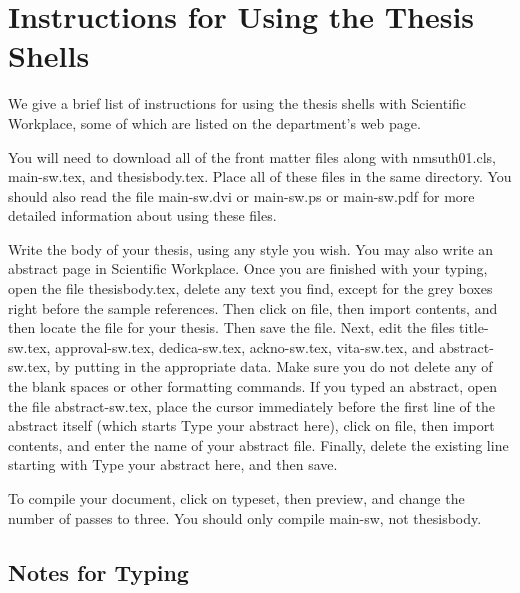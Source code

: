                       


\section{Instructions for Using the Thesis Shells}

We give a brief list of instructions for using the thesis shells with
Scientific Workplace, some of which are listed on the department's web page.

You will need to download all of the front matter files along with
nmsuth01.cls, main-sw.tex, and thesisbody.tex. Place all of these files in
the same directory. You should also read the file main-sw.dvi or main-sw.ps
or main-sw.pdf for more detailed information about using these files.

Write the body of your thesis, using any style you wish. You may also write
an abstract page in Scientific Workplace. Once you are finished with your
typing, open the file thesisbody.tex, delete any text you find, except for
the grey boxes right before the sample references. Then click on file, then
import contents, and then locate the file for your thesis. Then save the
file. Next, edit the files title-sw.tex, approval-sw.tex, dedica-sw.tex,
ackno-sw.tex, vita-sw.tex, and abstract-sw.tex, by putting in the
appropriate data. Make sure you do not delete any of the blank spaces or
other formatting commands. If you typed an abstract, open the file
abstract-sw.tex, place the cursor immediately before the first line of the
abstract itself (which starts Type your abstract here), click on file, then
import contents, and enter the name of your abstract file. Finally, delete
the existing line starting with Type your abstract here, and then save.

To compile your document, click on typeset, then preview, and change the
number of passes to three. You should only compile main-sw, not thesisbody.

\subsection{Notes for Typing}

